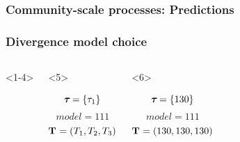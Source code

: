 \begin{frame}[t]
    \frametitle<1-4>{Community-scale processes: Predictions}
    \frametitle<5->{Divergence model choice}

    \vspace{-0.5cm}
    \begin{columns}[c]
        \begin{onlyenv}<1-4>
            \begin{minipage}[c][0.5\textheight][c]{\linewidth}
            \end{minipage}
        \end{onlyenv}
        \begin{onlyenv}<5>
            \begin{minipage}[c][0.5\textheight][c]{\linewidth}
                \begin{displaybox}[0.95\linewidth]
                    \begin{minipage}[c][0.45\textheight][c]{0.95\linewidth}
                        \[
                            \boldsymbol{\tau_{}} = \{\tau_{1}\}
                        \]\vspace{0mm}
                        \[
                            model = 111
                        \]\vspace{0mm}
                        \[
                            \mathbf{T_{}} = (T_{1},T_{2},T_{3})
                        \]\vspace{0mm}
                    \end{minipage}
                \end{displaybox}
            \end{minipage}
        \end{onlyenv}
        \begin{onlyenv}<6>
            \begin{minipage}[c][0.5\textheight][c]{\linewidth}
                \begin{displaybox}[0.95\linewidth]
                    \begin{minipage}[c][0.45\textheight][c]{0.95\linewidth}
                        \[
                            \boldsymbol{\tau_{}} = \{130\}
                        \]\vspace{0mm}
                        \[
                            model = 111
                        \]\vspace{0mm}
                        \[
                            \mathbf{T_{}} = (130,130,130)
                        \]\vspace{0mm}

\end{minipage}
\end{displaybox}
\end{minipage}
\end{onlyenv}
\end{columns}
\end{frame}
